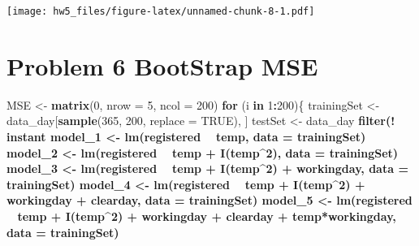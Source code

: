 \documentclass[]{article}
\newenvironment{Shaded}{\begin{snugshade}}{\end{snugshade}}
\newcommand{\KeywordTok}[1]{\textcolor[rgb]{0.13,0.29,0.53}{\textbf{#1}}}
\newcommand{\DataTypeTok}[1]{\textcolor[rgb]{0.13,0.29,0.53}{#1}}
\newcommand{\DecValTok}[1]{\textcolor[rgb]{0.00,0.00,0.81}{#1}}
\newcommand{\StringTok}[1]{\textcolor[rgb]{0.31,0.60,0.02}{#1}}
\newcommand{\OtherTok}[1]{\textcolor[rgb]{0.56,0.35,0.01}{#1}}
\newcommand{\ControlFlowTok}[1]{\textcolor[rgb]{0.13,0.29,0.53}{\textbf{#1}}}
\newcommand{\OperatorTok}[1]{\textcolor[rgb]{0.81,0.36,0.00}{\textbf{#1}}}
\newcommand{\NormalTok}[1]{#1}
\begin{document}
\texttt{[image: hw5\_files/figure-latex/unnamed-chunk-8-1.pdf]}

\section*{Problem 6 BootStrap MSE}

\begin{Shaded}
\begin{Highlighting}[]
\NormalTok{MSE <-}\StringTok{ }\KeywordTok{matrix}\NormalTok{(}\DecValTok{0}\NormalTok{, }\DataTypeTok{nrow =} \DecValTok{5}\NormalTok{, }\DataTypeTok{ncol =} \DecValTok{200}\NormalTok{)}
\ControlFlowTok{for}\NormalTok{ (i }\ControlFlowTok{in} \DecValTok{1}\OperatorTok{:}\DecValTok{200}\NormalTok{)\{}
\NormalTok{  trainingSet <-}\StringTok{ }\NormalTok{data_day[}\KeywordTok{sample}\NormalTok{(}\DecValTok{365}\NormalTok{, }\DecValTok{200}\NormalTok{, }\DataTypeTok{replace =} \OtherTok{TRUE}\NormalTok{), ]}
\NormalTok{  testSet <-}\StringTok{ }\NormalTok{data_day }\OperatorTok{%>%}
\StringTok{    }\KeywordTok{filter}\NormalTok{(}\OperatorTok{!}\StringTok{ }\NormalTok{instant }\OperatorTok{%in%}\StringTok{ }\NormalTok{trainingSet}\OperatorTok{$}\NormalTok{instant)}
\NormalTok{  model_}\DecValTok{1}\NormalTok{ <-}\StringTok{ }\KeywordTok{lm}\NormalTok{(registered }\OperatorTok{~}\StringTok{ }\NormalTok{temp, }\DataTypeTok{data =}\NormalTok{ trainingSet)}
\NormalTok{  model_}\DecValTok{2}\NormalTok{ <-}\StringTok{ }\KeywordTok{lm}\NormalTok{(registered }\OperatorTok{~}\StringTok{ }\NormalTok{temp }\OperatorTok{+}\StringTok{ }\KeywordTok{I}\NormalTok{(temp}\OperatorTok{^}\DecValTok{2}\NormalTok{), }\DataTypeTok{data =}\NormalTok{ trainingSet)}
\NormalTok{  model_}\DecValTok{3}\NormalTok{ <-}\StringTok{ }\KeywordTok{lm}\NormalTok{(registered }\OperatorTok{~}\StringTok{ }\NormalTok{temp }\OperatorTok{+}\StringTok{ }\KeywordTok{I}\NormalTok{(temp}\OperatorTok{^}\DecValTok{2}\NormalTok{) }\OperatorTok{+}\StringTok{ }\NormalTok{workingday, }\DataTypeTok{data =}\NormalTok{ trainingSet)}
\NormalTok{  model_}\DecValTok{4}\NormalTok{ <-}\StringTok{ }\KeywordTok{lm}\NormalTok{(registered }\OperatorTok{~}\StringTok{ }\NormalTok{temp }\OperatorTok{+}\StringTok{ }\KeywordTok{I}\NormalTok{(temp}\OperatorTok{^}\DecValTok{2}\NormalTok{) }\OperatorTok{+}\StringTok{ }\NormalTok{workingday }\OperatorTok{+}\StringTok{ }\NormalTok{clearday, }\DataTypeTok{data =}\NormalTok{ trainingSet)}
\NormalTok{  model_}\DecValTok{5}\NormalTok{ <-}\StringTok{ }\KeywordTok{lm}\NormalTok{(registered }\OperatorTok{~}\StringTok{ }\NormalTok{temp }\OperatorTok{+}\StringTok{ }\KeywordTok{I}\NormalTok{(temp}\OperatorTok{^}\DecValTok{2}\NormalTok{) }\OperatorTok{+}\StringTok{ }\NormalTok{workingday }\OperatorTok{+}\StringTok{ }\NormalTok{clearday }\OperatorTok{+}\StringTok{ }\NormalTok{temp}\OperatorTok{*}\NormalTok{workingday, }\DataTypeTok{data =}\NormalTok{ trainingSet)}
}}
\end{Highlighting}
\end{Shaded}
\end{document}
